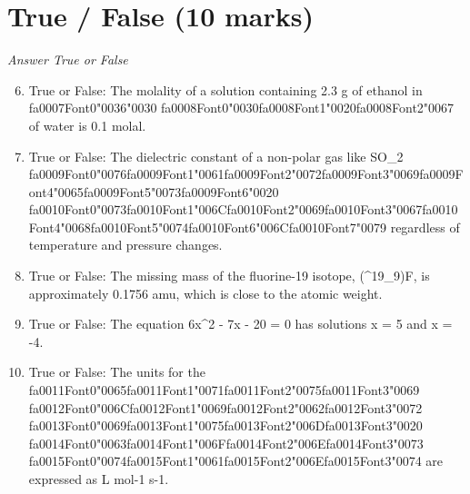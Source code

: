 \documentclass[12pt]{article}
\begin{document}
\section*{True / False (10 marks)}
\textit{Answer True or False}
\begin{enumerate}[label=\arabic*.]
\setcounter{enumi}{5}
\item True or False: The molality of a solution containing 2.3 g of ethanol in {\csname fa0007Font0\endcsname\char"0036}{\char"0030} {\csname fa0008Font0\endcsname\char"0030}{\csname fa0008Font1\endcsname\char"0020}{\csname fa0008Font2\endcsname\char"0067} of water is 0.1 molal.
\item True or False: The dielectric constant of a non-polar gas like SO\_2 {\csname fa0009Font0\endcsname\char"0076}{\csname fa0009Font1\endcsname\char"0061}{\csname fa0009Font2\endcsname\char"0072}{\csname fa0009Font3\endcsname\char"0069}{\csname fa0009Font4\endcsname\char"0065}{\csname fa0009Font5\endcsname\char"0073}{\csname fa0009Font6\endcsname\char"0020} {\csname fa0010Font0\endcsname\char"0073}{\csname fa0010Font1\endcsname\char"006C}{\csname fa0010Font2\endcsname\char"0069}{\csname fa0010Font3\endcsname\char"0067}{\csname fa0010Font4\endcsname\char"0068}{\csname fa0010Font5\endcsname\char"0074}{\csname fa0010Font6\endcsname\char"006C}{\csname fa0010Font7\endcsname\char"0079} regardless of temperature and pressure changes.
\item True or False: The missing mass of the fluorine-19 isotope, (\^{}19\_9)F, is approximately 0.1756 amu, which is close to the atomic weight.
\item True or False: The equation 6x\^{}2 - 7x - 20 = 0 has solutions x = 5 and x = -4.
\item True or False: The units for the {\csname fa0011Font0\endcsname\char"0065}{\csname fa0011Font1\endcsname\char"0071}{\csname fa0011Font2\endcsname\char"0075}{\csname fa0011Font3\endcsname\char"0069} {\csname fa0012Font0\endcsname\char"006C}{\csname fa0012Font1\endcsname\char"0069}{\csname fa0012Font2\endcsname\char"0062}{\csname fa0012Font3\endcsname\char"0072} {\csname fa0013Font0\endcsname\char"0069}{\csname fa0013Font1\endcsname\char"0075}{\csname fa0013Font2\endcsname\char"006D}{\csname fa0013Font3\endcsname\char"0020} {\csname fa0014Font0\endcsname\char"0063}{\csname fa0014Font1\endcsname\char"006F}{\csname fa0014Font2\endcsname\char"006E}{\csname fa0014Font3\endcsname\char"0073} {\csname fa0015Font0\endcsname\char"0074}{\csname fa0015Font1\endcsname\char"0061}{\csname fa0015Font2\endcsname\char"006E}{\csname fa0015Font3\endcsname\char"0074} are expressed as L mol-1 s-1.
\end{enumerate}
\end{document}

